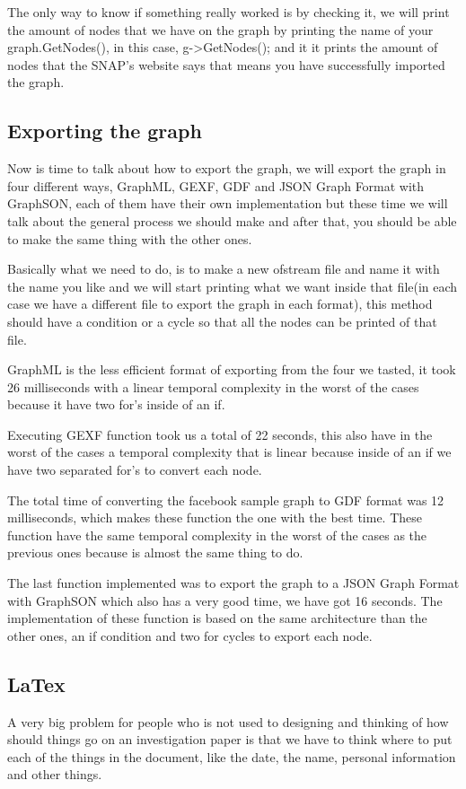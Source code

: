 \documentclass{sig-alternate-05-2015}
\begin{document}
The only way to know if something really worked is by checking it, we
will print the amount of nodes that we have on the graph by printing
the name of your graph.GetNodes(), in this case, g->GetNodes(); and it
it prints the amount of nodes that the SNAP's website says that means you
have successfully imported the graph.


\subsection{Exporting the graph}
Now is time to talk about how to export the graph, we will
export the graph in four different ways, GraphML, GEXF,
GDF and JSON Graph Format with GraphSON, each of them have their own
implementation but these time we will talk about the general
process we should make and after that, you should be able
to make the same thing with the other ones.

Basically what we need to do, is to make a new ofstream file
and name it with the name you like and we will start printing
what we want inside that file(in each case we have
a different file to export the graph in each format),
this method should have a condition or a cycle so
that all the nodes can be printed  of that file.

GraphML is the less efficient format of exporting from
the four we tasted, it took 26 milliseconds with a
linear temporal complexity in the worst of the cases
because it have two for's inside of an if.

Executing GEXF function took us a total of 22 seconds,
this also have in the worst of the cases a temporal complexity
that is linear because inside of an if we have two separated
for's to convert each node.

The total time of converting the facebook sample graph
to GDF format was 12 milliseconds, which makes these
function the one with the best time. These function
have the same temporal complexity in the worst of the cases
as the previous ones because is almost the same thing
to do.

The last function implemented was to export the graph
to a JSON Graph Format with GraphSON which also has
a very good time, we have got 16 seconds. The
implementation of these function is based on the same
architecture than the other ones, an if condition
and two for cycles to export each node.



\subsection{LaTex}
A very big problem for people who is not used to designing and thinking
of how should things go on an investigation paper is that we have to
think where to put each of the things in the document, like the date,
the name, personal information and other things.
\end{document}
